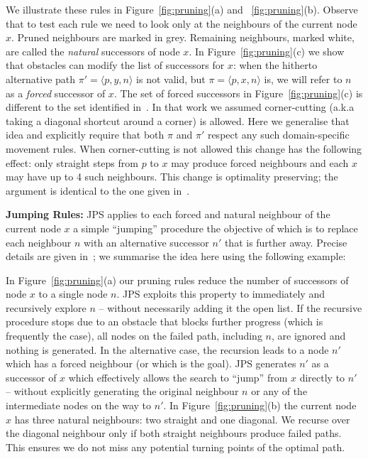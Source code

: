 We illustrate these rules in Figure~\ref{fig:pruning}(a) and ~\ref{fig:pruning}(b).
Observe that to test each rule we need to look only at
the neighbours of the current node $x$. 
Pruned neighbours are marked in grey. Remaining neighbours, marked
white, are called the \emph{natural} successors of node $x$.  
In Figure~\ref{fig:pruning}(c) we show
that obstacles can modify the list of successors for $x$:
when the hitherto alternative path $\pi' = \langle p, y, n \rangle$ is
not valid, but $\pi = \langle p, x, n \rangle$ is, we will refer to $n$ as
a \emph{forced} successor of $x$.
The set of forced successors in Figure~\ref{fig:pruning}(c) is different
to the set identified in~\cite{harabor11b}. 
In that work we assumed corner-cutting (a.k.a taking a diagonal shortcut around a corner) is allowed.
Here we generalise that idea and explicitly require that both $\pi$ and $\pi'$  respect 
any such domain-specific movement rules.
When corner-cutting is not allowed this change has the following effect:
only straight steps from $p$ to $x$ may produce forced neighbours and each $x$ may have 
up to 4 such neighbours.
This change is optimality preserving; the argument is identical to 
the one given in~\cite{harabor11b}.

\textbf{Jumping Rules:}
JPS applies to each forced and natural neighbour of the current node $x$ a simple
``jumping'' procedure the objective of which is to replace each neighbour $n$ with an 
alternative successor $n'$ that is further away. Precise details are given
in~\cite{harabor11b}; we summarise the idea here using the following example:

\begin{example}
In Figure~\ref{fig:pruning}(a) our pruning rules reduce the number
of successors of node $x$ to a single node $n$.
JPS exploits this property to immediately and recursively
explore $n$ -- without necessarily adding it the open list.
If the recursive procedure stops due to an obstacle that blocks further progress
(which is frequently the case), all nodes on the failed path, including $n$, are ignored
and nothing is generated.
In the alternative case, the recursion leads to a node $n'$ which has a forced
neighbour (or which is the goal). JPS generates $n'$ as a successor of $x$ which
effectively allows the search to ``jump'' from $x$ directly to $n'$ -- without explicitly 
generating the original neighbour $n$ or any of the intermediate nodes on the way to $n'$.
In Figure~\ref{fig:pruning}(b) the current node $x$ has three natural neighbours: two straight and one diagonal.
We recurse over the diagonal neighbour only if both straight neighbours produce
failed paths. This ensures we do not miss any potential turning points of the optimal path.
\end{example}

